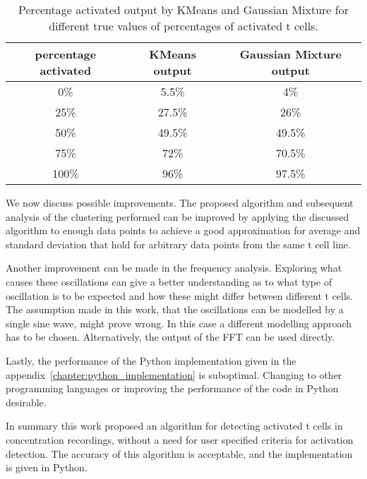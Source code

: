 \begin{table}[h]
	\centering
	\begin{tabular}{|c|c|c|}
		\hline
		percentage activated & KMeans output & Gaussian Mixture output\\
		\hline
		0\% & 5.5\% & 4\%\\
		\hline
		25\% & 27.5\% & 26\%\\
		\hline
		50\% & 49.5\% & 49.5\%\\
		\hline
		75\% & 72\% & 70.5\%\\
		\hline
		100\% & 96\% & 97.5\%\\
		\hline
	\end{tabular}
	\caption{Percentage activated output by KMeans and Gaussian Mixture for different true values of percentages of activated t cells.}
	\label{tab:accuracy}
\end{table}

We now discuss possible improvements. The proposed algorithm and subsequent analysis of the clustering performed can be improved by applying the discussed algorithm to enough data points to achieve a good approximation for average and standard deviation that hold for arbitrary data points from the same t cell line.

Another improvement can be made in the frequency analysis. Exploring what causes these oscillations can give a better understanding as to what type of oscillation is to be expected and how these might differ between different t cells. The assumption made in this work, that the oscillations can be modelled by a single sine wave, might prove wrong. In this case a different modelling approach has to be chosen. Alternatively, the output of the FFT can be used directly.

Lastly, the performance of the Python implementation given in the appendix~\ref{chapter:python_implementation} is suboptimal. Changing to other programming languages or improving the performance of the code in Python desirable.

In summary this work proposed an algorithm for detecting activated t cells in \Calcium concentration recordings, without a need for user specified criteria for activation detection. The accuracy of this algorithm is acceptable, and the implementation is given in Python.